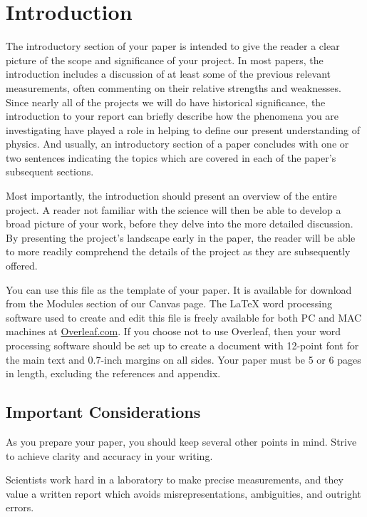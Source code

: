 \section{Introduction} \label{sec:introduction}

The introductory section of your paper is intended to give the reader a clear picture of the scope and significance of your project. In most papers, the introduction includes a discussion of at least some of the previous relevant measurements, often commenting on their relative strengths and weaknesses. Since nearly all of the projects we will do have historical significance, the introduction to your report can briefly describe how the phenomena you are investigating have played a role in helping to define our present understanding of physics. And usually, an introductory section of a paper concludes with one or two sentences indicating the topics which are covered in each of the paper's subsequent sections. 

Most importantly, the introduction should present an overview of the entire project. A reader not familiar with the science will then be able to develop a broad picture of your work, before they delve into the more detailed discussion. By presenting the project's landscape early in the paper, the reader will be able to more readily comprehend the details of the project as they are subsequently offered.

You can use this file as the template of your paper. It is available for download from the Modules section of our Canvas page. The LaTeX word processing software used to create and edit this file is freely available for both PC and MAC machines at \href{https://www.overleaf.com}{Overleaf.com}. If you choose not to use Overleaf, then your word processing software should be set up to create a document with 12-point font for the main text and 0.7-inch margins on all sides. Your paper must be 5 or 6 pages in length, excluding the references and appendix.

\subsection{Important Considerations}

    As you prepare your paper, you should keep several other points in mind. Strive to achieve clarity and accuracy in your writing.

    Scientists work hard in a laboratory to make precise measurements, and they value a written report which avoids misrepresentations, ambiguities, and outright errors. 

